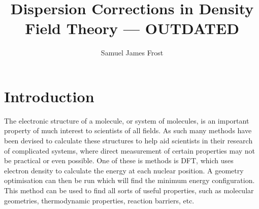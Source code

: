 \documentclass[10pt,a4paper,twocolumn,twoside]{extarticle}
\title{Dispersion Corrections in Density Field Theory --- OUTDATED}
\author{Samuel James Frost}
\begin{document}
	\thispagestyle{empty}
	\tableofcontents

	
	\section{Introduction}
	The electronic structure of a molecule, or system of molecules, is an important property of much interest to scientists of all fields. As such many methods have been devised to calculate these structures to help aid scientists in their research of complicated systems, where direct measurement of certain properties may not be practical or even possible. One of these is methods is DFT, which uses electron density to calculate the energy at each nuclear position. A geometry optimisation can then be run which will find the minimum energy configuration. \cite{Parr1989} This method can be used to find all sorts of useful properties, such as molecular geometries, thermodynamic properties, reaction barriers, etc.\cite{Jones2015}
\end{document}
